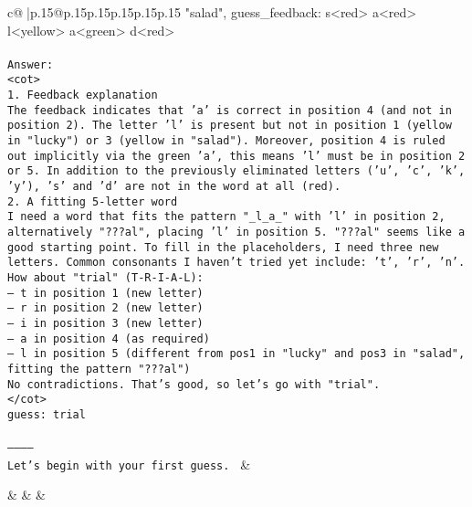 \documentclass{article}
\begin{document}
{\begin{supertabular}{c@{$\;$}|p{.15\linewidth}@{}p{.15\linewidth}p{.15\linewidth}p{.15\linewidth}p{.15\linewidth}p{.15\linewidth}}
{{{"salad", guess_feedback: s<red> a<red> l<yellow> a<green> d<red>\\ \tt \\ \tt Answer:\\ \tt <cot>\\ \tt 1. Feedback explanation\\ \tt The feedback indicates that 'a' is correct in position 4 (and not in position 2). The letter 'l' is present but not in position 1 (yellow in "lucky") or 3 (yellow in "salad"). Moreover, position 4 is ruled out implicitly via the green 'a', this means 'l' must be in position 2 or 5. In addition to the previously eliminated letters ('u', 'c', 'k', 'y'), 's' and 'd' are not in the word at all (red).\\ \tt 2. A fitting 5-letter word\\ \tt I need a word that fits the pattern "_l_a_" with 'l' in position 2, alternatively "???al", placing 'l' in position 5. "???al" seems like a good starting point. To fill in the placeholders, I need three new letters. Common consonants I haven't tried yet include: 't', 'r', 'n'. How about "trial" (T-R-I-A-L):\\ \tt — t in position 1 (new letter)\\ \tt — r in position 2 (new letter)\\ \tt — i in position 3 (new letter)\\ \tt — a in position 4 (as required)\\ \tt — l in position 5 (different from pos1 in "lucky" and pos3 in "salad", fitting the pattern "???al")\\ \tt No contradictions. That's good, so let's go with "trial".\\ \tt </cot>\\ \tt guess: trial\\ \tt \\ \tt -----------\\ \tt Let's begin with your first guess. 
	  } 
	   } 
	   } 
	 & \\ 
 

    \theutterance {}  

    &  
	 & & \\ 
 


\end{supertabular}}
\end{document}
